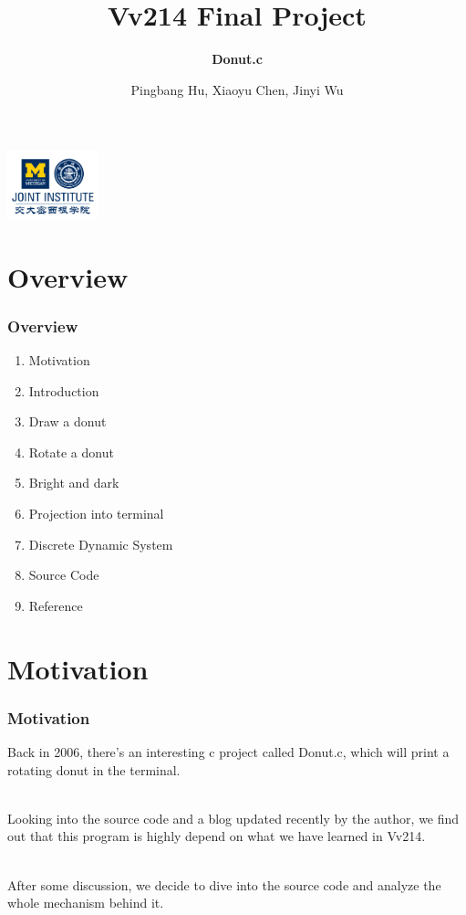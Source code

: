 \documentclass[12pt, t]{beamer}
\title{Vv214 Final Project}
\subtitle{\textbf{Donut.c}}
\institute[UM-SJTU JI]{University of Michigan-Shanghai Jiao Tong University Joint Institute}
\author{Pingbang Hu, Xiaoyu Chen, Jinyi Wu}
\newcommand{\nullspace}{~\\[15pt]}
\begin{document}
\begin{frame}
    \titlepage
    \begin{center}
        \includegraphics[height=2cm]{Figures/logo/logo2.png}
    \end{center}
\end{frame}

\section{Overview}
    \begin{frame}
        \frametitle{Overview}
        \begin{enumerate}
            \item Motivation
            \item Introduction
            \item Draw a donut
            \item Rotate a donut
            \item Bright and dark
            \item Projection into terminal
            \item Discrete Dynamic System
            \item Source Code
            \item Reference
        \end{enumerate}
    \end{frame}


\section{Motivation}
\begin{frame}
    \frametitle{Motivation}

    Back in 2006, there's an interesting c project called Donut.c, which will print a rotating 
    donut in the terminal.

    \nullspace
    Looking into the source code and a blog updated recently by the author, we find out 
    that this program is highly depend on what we have learned in Vv214.

    \nullspace
    After some discussion, we decide to dive into the source code and analyze the whole mechanism 
    behind it.

\end{frame}
\end{document}
